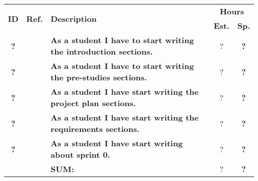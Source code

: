 \label{tab:sprint1Documentationstories}
\def\arraystretch{1.25}
 
\begin{longtable}{ccXcc}

\toprule[0.5mm]
\multirow{2}{*}{\textbf{ID}} &
\multirow{2}{*}{\textbf{Ref.}} & \multirow{2}{*}{\textbf{Description}} & \multicolumn{2}{c}{\textbf{Hours}} \\
 					& & & \textbf{Est.} & \textbf{Sp.} \\
\midrule
\textbf{?} 	&& {\bf As a student I have to start writing the introduction sections.} 	& 		?	& \textbf{?} \\
\textbf{?} 	&& {\bf As a student I have to start writing the pre-studies sections.} 	& 		?	& \textbf{?} \\
\textbf{?} 	&& {\bf As a student I have start writing the project plan sections.} 		& 		?	& \textbf{?} \\
\textbf{?} 	&& {\bf As a student I have start writing the requirements sections.} 		& 		?	& \textbf{?} \\
\textbf{?} 	&& {\bf As a student I have start writing about sprint 0.} 					& 		?	& \textbf{?} \\							
				
\hline
				&& \textbf{SUM:}		&		?	& \textbf{?}
 \\																			
\bottomrule[0.5mm]
\end{longtable}
